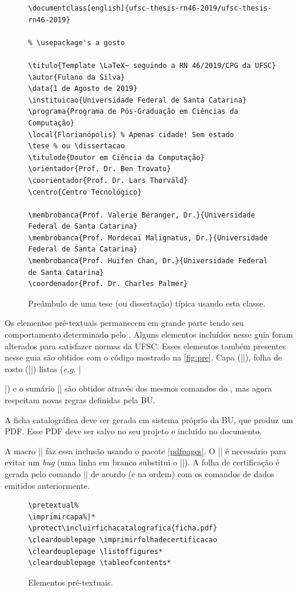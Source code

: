 \documentclass[embeddedlogo]{../ufsc-thesis-rn46-2019}
\begin{document}
\begin{figure}[tb]
  \centering
  \caption{Preâmbulo de uma tese (ou dissertação) típica usando esta classe.}
  \label{fig:preambulo}

  \begin{verbatim}
\documentclass[english]{ufsc-thesis-rn46-2019/ufsc-thesis-rn46-2019}

% \usepackage's a gosto

\titulo{Template \LaTeX~ seguindo a RN 46/2019/CPG da UFSC}
\autor{Fulano da Silva}
\data{1 de Agosto de 2019}
\instituicao{Universidade Federal de Santa Catarina}
\programa{Programa de Pós-Graduação em Ciências da Computação}
\local{Florianópolis} % Apenas cidade! Sem estado
\tese % ou \dissertacao
\titulode{Doutor em Ciência da Computação}
\orientador{Prof. Dr. Ben Trovato}
\coorientador{Prof. Dr. Lars Thørväld}
\centro{Centro Tecnológico}

\membrobanca{Prof. Valerie Béranger, Dr.}{Universidade Federal de Santa Catarina}
\membrobanca{Prof. Mordecai Malignatus, Dr.}{Universidade Federal de Santa Catarina}
\membrobanca{Prof. Huifen Chan, Dr.}{Universidade Federal de Santa Catarina}
\coordenador{Prof. Dr. Charles Palmer}
  \end{verbatim}
\end{figure}

Os elementos pré-textuais permanecem em grande parte tendo seu comportamento
determinado pelo \abnTeX. Alguns elementos incluídos nesse guia foram alterados
para satisfazer normas da UFSC. Esses elementos também presentes
nesse guia são obtidos com o código mostrado na \autoref{fig:pre}. Capa
(\mt|\imprimircapa|), folha de rosto (\mt|\imprimirfolhaderosto*|) listas
(\emph{e.g.} \mt|\listoffigures*|) e o sumário \mt|\tableofcontents*| são
obtidos através dos mesmos comandos do \abnTeX, mas agora respeitam novas
regras definidas pela BU.

A ficha catalográfica deve ser gerada em sistema próprio da BU, que produz um
PDF. Esse PDF deve ser salvo no seu projeto e incluído no documento.

A macro \mt|| faz essa inclusão usando o
pacote \href{https://www.ctan.org/pkg/pdfpages}{\mt|pdfpages|}. O \mt|\protect|
é necessário para evitar um \emph{bug} (uma linha em branco substitui o
\mt|\protect|).  A folha de certificação é gerada pelo comando
\mt|\imprimirfolhadecertificacao| de acordo (e na ordem) com os comandos de
dados emitidos anteriormente.

\begin{figure}[tb]
  \centering
  \caption{Elementos pré-textuais.}
  \label{fig:pre}
  \begin{verbatim}
\pretextual%
\imprimircapa%|*
\protect\incluirfichacatalografica{ficha.pdf}
\cleardoublepage \imprimirfolhadecertificacao
\cleardouplepage \listoffigures*
\cleardoublepage \tableofcontents*
  \end{verbatim}
\end{figure}
\end{document}
